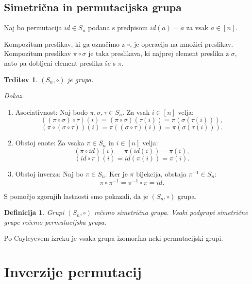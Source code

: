 \documentclass[a4paper, 12pt]{book}
\newtheorem{definicija}{Definicija}[chapter]
\newtheorem{trditev}{Trditev}[chapter]
\newenvironment{dokaz}{\emph{Dokaz.}\ }{\hspace{\fill}{$\Box$}}
\begin{document}
\subsection{ Simetrična in permutacijska grupa }

Naj bo permutacija $id \in S_n$ podana s predpisom $id(a) = a$ za vsak $a \in [n]$.

Kompozitum preslikav, ki ga označimo z $\circ$, je operacija na množici preslikav. Kompozitum preslikav $\pi \circ \sigma$ je taka preslikava, ki najprej element preslika z $\sigma$, nato pa dobljeni element preslika še s $\pi$.

\begin{trditev}
    $(S_n, \circ)$ je grupa.
\end{trditev}
\begin{dokaz}
    \begin{enumerate}
        \item Asociativnost: Naj bodo $\pi, \sigma, \tau \in S_n$. Za vsak $i \in [n]$ velja: 
        \[
            ((\pi \circ \sigma) \circ \tau)(i) = (\pi \circ \sigma)(\tau(i)) = \pi(\sigma(\tau(i))),
        \]
        \[
            (\pi \circ (\sigma \circ \tau))(i) = \pi((\sigma \circ \tau)(i)) = \pi(\sigma(\tau(i))).
        \]
        \item Obstoj enote: Za vsaka $\pi \in S_n$ in $i \in [n]$ velja:
        \[
            (\pi \circ id)(i) = \pi(id(i)) = \pi(i),
        \]
        \[
            (id \circ \pi)(i) = id(\pi(i)) = \pi(i).
        \]
        \item Obstoj inverza: Naj bo $\pi \in S_n$. Ker je $\pi$ bijekcija, obstaja $\pi^{-1} \in S_n$:
        \[
            \pi \circ \pi^{-1} = \pi^{-1} \circ \pi = id.
        \]
    \end{enumerate}
    S pomočjo zgornjih lastnosti smo pokazali, da je $(S_n, \circ)$ grupa.
\end{dokaz}

\begin{definicija}
    Grupi $(S_n, \circ)$ rečemo simetrična grupa. Vsaki podgrupi simetrične grupe rečemo permutacijska grupa.
\end{definicija}
Po Cayleyevem izreku \cite{dsSkripta} je vsaka grupa izomorfna neki permutacijski grupi.


\section{ Inverzije permutacij }
\end{document}
